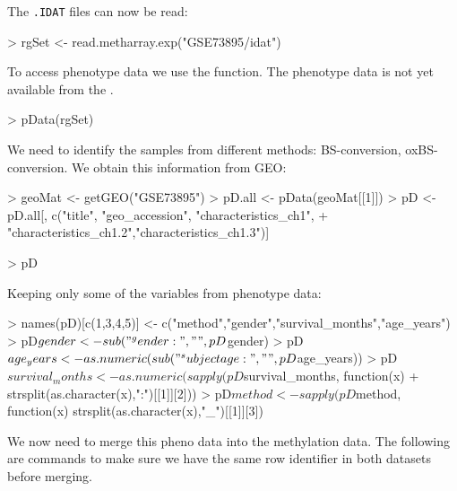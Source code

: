\documentclass{article}
\begin{document}
The \verb|.IDAT| files can now be read:
\begin{Schunk}
\begin{Sinput}
> rgSet <- read.metharray.exp("GSE73895/idat")
\end{Sinput}
\end{Schunk}


To access phenotype data we use the  function. The phenotype data is not yet available from the .
\begin{Schunk}
\begin{Sinput}
> pData(rgSet)
\end{Sinput}
\end{Schunk}

We need to identify the samples from different methods: BS-conversion, oxBS-conversion. We obtain this information from GEO:

\begin{Schunk}
\begin{Sinput}
> geoMat <- getGEO("GSE73895")
> pD.all <- pData(geoMat[[1]])
> pD <- pD.all[, c("title", "geo_accession", "characteristics_ch1",
+                  "characteristics_ch1.2","characteristics_ch1.3")]
\end{Sinput}
\end{Schunk}



\begin{Schunk}
\begin{Sinput}
> pD
\end{Sinput}
\end{Schunk}

Keeping only some of the variables from phenotype data:
\begin{Schunk}
\begin{Sinput}
> names(pD)[c(1,3,4,5)] <- c("method","gender","survival_months","age_years")
> pD$gender <- sub("^gender: ", "", pD$gender)
> pD$age_years <- as.numeric(sub("^subject age: ", "", pD$age_years))
> pD$survival_months <- as.numeric(sapply(pD$survival_months, function(x)
+   strsplit(as.character(x),":")[[1]][2]))
> pD$method <- sapply(pD$method, function(x) strsplit(as.character(x),"_")[[1]][3])
\end{Sinput}
\end{Schunk}

We now need to merge this pheno data into the methylation data. The following are commands to make sure we have the same row identifier in both datasets before merging.

\begin{Schunk}
\end{Schunk}
\end{document}
